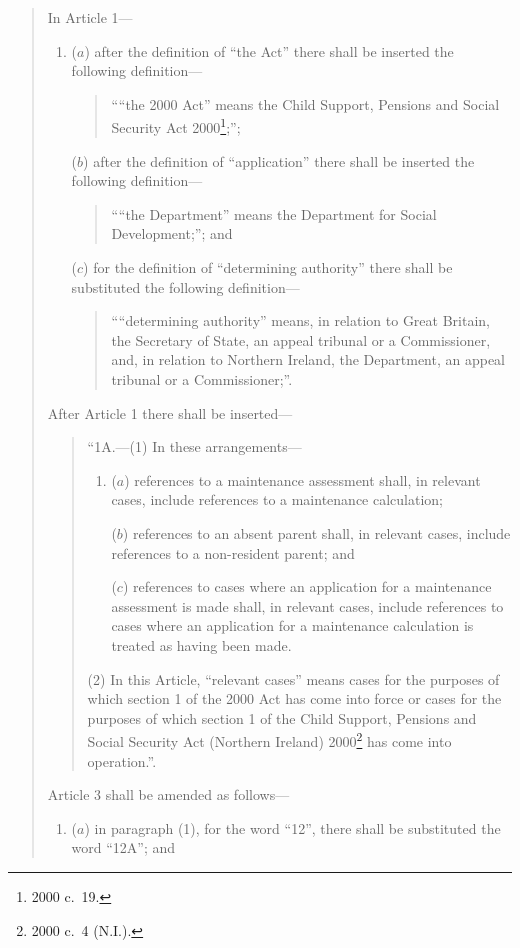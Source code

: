 \documentclass[12pt,a4paper]{article}
\begin{document}
\begin{quotation}
In Article 1—
\begin{enumerate}\item[]
($a$) after the definition of “the Act” there shall be inserted the following definition—
\begin{quotation}
““the 2000 Act” means the Child Support, Pensions and Social Security Act 2000\footnote{2000 c.\ 19.};”;
\end{quotation}

($b$) after the definition of “application” there shall be inserted the following definition—
\begin{quotation}
““the Department” means the Department for Social Development;”; and
\end{quotation}

($c$) for the definition of “determining authority” there shall be substituted the following definition—
\begin{quotation}
    ““determining authority” means, in relation to Great Britain, the Secretary of State, an appeal tribunal or a Commissioner, and, in relation to Northern Ireland, the Department, an appeal tribunal or a Commissioner;”. 
\end{quotation}
\end{enumerate}

After Article 1 there shall be inserted—
\begin{quotation}
“1A.---(1)  In these arrangements—
\begin{enumerate}\item[]
($a$) references to a maintenance assessment shall, in relevant cases, include references to a maintenance calculation;

($b$) references to an absent parent shall, in relevant cases, include references to a non-resident parent; and

($c$) references to cases where an application for a maintenance assessment is made shall, in relevant cases, include references to cases where an application for a maintenance calculation is treated as having been made.
\end{enumerate}

(2) In this Article, “relevant cases” means cases for the purposes of which section 1 of the 2000 Act has come into force or cases for the purposes of which section 1 of the Child Support, Pensions and Social Security Act (Northern Ireland) 2000\footnote{2000 c.\ 4 (N.I.).} has come into operation.”.
\end{quotation}

Article 3 shall be amended as follows—
\begin{enumerate}\item[]
($a$) in paragraph (1), for the word “12”, there shall be substituted the word “12A”; and


\end{enumerate}
\end{quotation}
\end{document}
